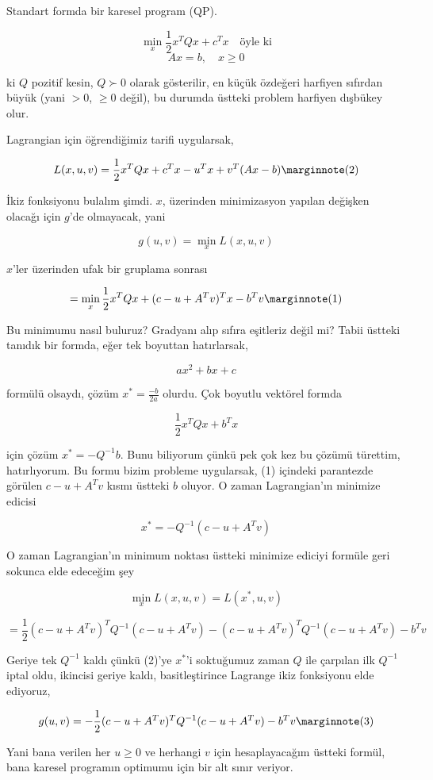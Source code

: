 \documentclass[12pt,fleqn]{article}\usepackage{../../common}
\begin{document}
Standart formda bir karesel program (QP). 

$$
\min_x \frac{1}{2} x^T Q x + c^T x \quad \textrm{öyle ki}
$$
$$
Ax = b, \quad x \ge 0
$$

ki $Q$ pozitif kesin, $Q \succ 0$ olarak gösterilir, en küçük özdeğeri
harfiyen sıfırdan büyük (yani $>0$, $\ge 0$ değil), bu durumda üstteki
problem harfiyen dışbükey olur.

Lagrangian için öğrendiğimiz tarifi uygularsak, 

$$
L(x,u,v) = \frac{1}{2} x^T Q x + c^Tx  - u^T x + v^T (Ax - b)
\mlabel{2}
$$

İkiz fonksiyonu bulalım şimdi. $x$, üzerinden minimizasyon yapılan değişken
olacağı için $g$'de olmayacak, yani

$$
g(u,v) = \min_x L(x,u,v) 
$$

$x$'ler üzerinden ufak bir gruplama sonrası

$$
= \min_x \frac{1}{2} x^T Q x + (c - u + A^T v)^T x - b^T v  
\mlabel{1}
$$

Bu minimumu nasıl buluruz? Gradyanı alıp sıfıra eşitleriz değil mi? Tabii
üstteki tanıdık bir formda, eğer tek boyuttan hatırlarsak, 

$$
ax^2 + bx + c
$$

formülü olsaydı, çözüm $x^* = \frac{-b}{2a}$ olurdu. Çok boyutlu vektörel
formda

$$
\frac{1}{2} x^T Q x + b^T x
$$

için çözüm $x^* = -Q^{-1} b$. Bunu biliyorum çünkü pek çok kez bu çözümü
türettim, hatırlıyorum. Bu formu bizim probleme uygularsak, (1) içindeki
parantezde görülen $c - u + A^T v$ kısmı üstteki $b$ oluyor. O zaman
Lagrangian'ın minimize edicisi

$$
x^* = -Q^{-1} (c - u + A^T v)
$$

O zaman Lagrangian'ın minimum noktası üstteki minimize ediciyi formüle geri
sokunca elde edeceğim şey

$$
\min_x L(x,u,v) = L(x^*,u,v)
$$

$$
= \frac{1}{2} 
(c - u + A^Tv)^T Q^{-1} (c - u + A^Tv) - 
(c - u + A^Tv)^T Q^{-1} (c - u + A^Tv) - b^T v
$$

Geriye tek $Q^{-1} $ kaldı çünkü (2)'ye $x^*$'i soktuğumuz zaman $Q$ ile
çarpılan ilk $Q^{-1} $ iptal oldu, ikincisi geriye kaldı, basitleştirince
Lagrange ikiz fonksiyonu elde ediyoruz,

$$
g(u,v) = -\frac{1}{2} (c - u + A^Tv)^T Q^{-1}  (c - u + A^Tv) - b^Tv
\mlabel{3}
$$

Yani bana verilen her $u \ge 0$ ve herhangi $v$ için hesaplayacağım üstteki
formül, bana karesel programın optimumu için bir alt sınır veriyor.
\end{document}
